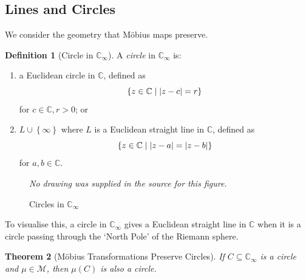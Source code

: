 \documentclass{article}
\newtheorem{theorem}{Theorem}[section]
\theoremstyle{definition}
\newtheorem{definition}[theorem]{Definition}
\theoremstyle{remark}
\DeclarePairedDelimiter{\abs}{\lvert}{\rvert}
\newcommand{\pqty}[1]{\left(#1\right)}
\newcommand{\Bqty}[1]{\left\{#1\right\}}
\newcommand{\set}[2]{\{#1\mid #2\}}
\newcommand{\CC}{\mathbb{C}}
\newcommand{\compactify}{_{\infty}}
\newcommand{\mobius}{\mathcal{M}}
\begin{document}
\subsection{Lines and Circles}
\label{sec:lines-and-circles}

We consider the geometry that M\"{o}bius maps preserve.

\begin{definition}[Circle in \(\CC\compactify\)]
    \label{def:circle-riemann}%
    A \emph{circle} in \(\CC\compactify\) is:
    \begin{enumerate}
        \item a Euclidean circle in \(\CC\), defined as
        \[
            \set{z \in \CC}{\abs{z - c} = r}
        \]
        for \(c \in \CC, r > 0\); or
        \item \(L \cup \Bqty{\infty}\) where \(L\) is a Euclidean straight line in \(\CC\), defined as
        \[
            \set{z \in \CC}{\abs{z - a} = \abs{z - b}}
        \]
        for \(a, b \in \CC\).
    \end{enumerate}
\end{definition}

\begin{figure}[ht!]
    \centering
    \emph{No drawing was supplied in the source for this figure.}\par
\caption{Circles in \(\CC\compactify\)}
    \label{fig:circles-in-riemann-sphere}
\end{figure}

To visualise this, a circle in \(\CC\compactify\) gives a Euclidean straight line in \(\CC\) when it is a circle passing through the `North Pole' of the Riemann sphere.

\begin{theorem}[M\"{o}bius Transformations Preserve Circles]
    \label{thm:mobius-preserve-circles}%
    If \(C \subseteq \CC\compactify\) is a circle and \(\mu \in \mobius\), then \(\mu\pqty{C}\) is also a circle.
\end{theorem}
\end{document}
